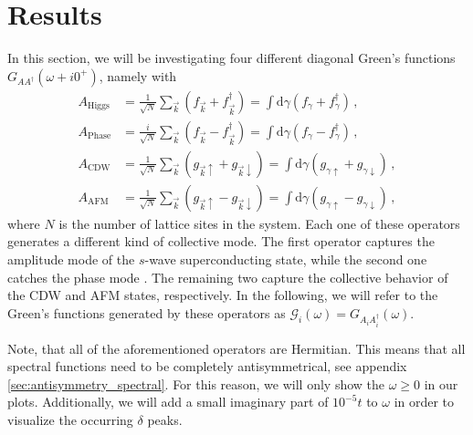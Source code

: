 \documentclass[
    reprint, 
    aps,
    preprintnumbers,
    twocolumn,
    prb,
    superscriptaddress
]{revtex4-2}
\newcommand{\vk}{\vec{k}}
\newcommand{\up}{\uparrow}
\newcommand{\down}{\downarrow}
\newcommand{\dgamma}{\mathrm{d}\gamma}
\begin{document}
\section{Results}\label{sec:results}

In this section, we will be investigating four different diagonal Green's functions $G_{AA^\dagger}(\omega + i0^+)$, namely with
\begin{subequations}
    \label{eqn:resolvent_bases}
    \begin{align}
        A_\text{Higgs} &= \frac{1}{\sqrt{N}} \sum_{\vk} \left( f_{\vk} + f_{\vk}^\dagger \right)  
            = \int \dgamma \left( f_{\gamma} + f_{\gamma}^\dagger \right) \,,\\
        A_\text{Phase} &= \frac{i}{\sqrt{N}} \sum_{\vk} \left( f_{\vk} - f_{\vk}^\dagger \right) = \int \dgamma \left( f_{\gamma} - f_{\gamma}^\dagger \right) \,,\\
        A_\text{CDW}   &= \frac{1}{\sqrt{N}} \sum_{\vk} \left( g_{\vk \up} + g_{\vk \down} \right) = \int \dgamma \left( g_{\gamma \up} + g_{\gamma \down} \right) \,,\\
        A_\text{AFM}   &= \frac{1}{\sqrt{N}} \sum_{\vk} \left( g_{\vk \up} - g_{\vk \down} \right) = \int \dgamma \left( g_{\gamma \up} - g_{\gamma \down} \right) \,,
    \end{align}
\end{subequations}
where $N$ is the number of lattice sites in the system. 
Each one of these operators generates a different kind of collective mode.
The first operator captures the amplitude mode of the $s$-wave superconducting state, while the second one catches the phase mode \cite{Fan22}.
The remaining two capture the collective behavior of the CDW and AFM states, respectively.
In the following, we will refer to the Green's functions generated by these operators as $\mathcal{G}_{i}(\omega) = G_{A_i A_i^\dagger}(\omega)$.

Note, that all of the aforementioned operators are Hermitian. 
This means that all spectral functions need to be completely antisymmetrical, see appendix \ref{sec:antisymmetry_spectral}.
For this reason, we will only show the $\omega \geq 0$ in our plots. 
Additionally, we will add a small imaginary part of $10^{-5}t$ to $\omega$ in order to visualize the occurring $\delta$ peaks.

\end{document}
